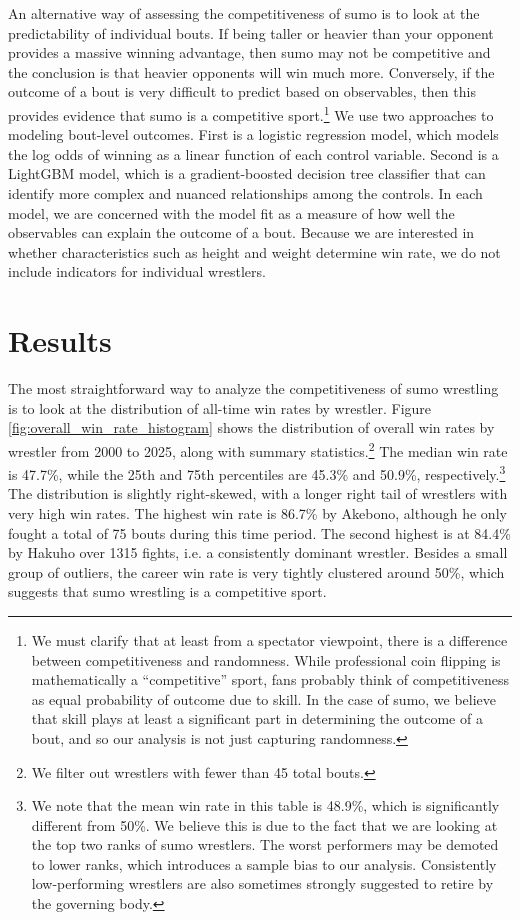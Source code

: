 \documentclass[12pt]{article}
\begin{document}
An alternative way of assessing the competitiveness of sumo is to look at the predictability of individual bouts. If being taller or heavier than your opponent provides a massive winning advantage, then sumo may not be competitive and the conclusion is that heavier opponents will win much more. Conversely, if the outcome of a bout is very difficult to predict based on observables, then this provides evidence that sumo is a competitive sport.\footnote{We must clarify that at least from a spectator viewpoint, there is a difference between competitiveness and randomness. While professional coin flipping is mathematically a ``competitive'' sport, fans probably think of competitiveness as equal probability of outcome due to skill. In the case of sumo, we believe that skill plays at least a significant part in determining the outcome of a bout, and so our analysis is not just capturing randomness.} We use two approaches to modeling bout-level outcomes. First is a logistic regression model, which models the log odds of winning as a linear function of each control variable. Second is a LightGBM model, which is a gradient-boosted decision tree classifier that can identify more complex and nuanced relationships among the controls. In each model, we are concerned with the model fit as a measure of how well the observables can explain the outcome of a bout. Because we are interested in whether characteristics such as height and weight determine win rate, we do not include indicators for individual wrestlers.

\section{Results}
The most straightforward way to analyze the competitiveness of sumo wrestling is to look at the distribution of all-time win rates by wrestler. Figure \ref{fig:overall_win_rate_histogram} shows the distribution of overall win rates by wrestler from 2000 to 2025, along with summary statistics.\footnote{We filter out wrestlers with fewer than 45 total bouts.} The median win rate is 47.7\%, while the 25th and 75th percentiles are 45.3\% and 50.9\%, respectively.\footnote{We note that the mean win rate in this table is 48.9\%, which is significantly different from 50\%. We believe this is due to the fact that we are looking at the top two ranks of sumo wrestlers. The worst performers may be demoted to lower ranks, which introduces a sample bias to our analysis. Consistently low-performing wrestlers are also sometimes strongly suggested to retire by the governing body.} The distribution is slightly right-skewed, with a longer right tail of wrestlers with very high win rates. The highest win rate is 86.7\% by Akebono, although he only fought a total of 75 bouts during this time period. The second highest is at 84.4\% by Hakuho over 1315 fights, i.e. a consistently dominant wrestler. Besides a small group of outliers, the career win rate is very tightly clustered around 50\%, which suggests that sumo wrestling is a competitive sport.
\end{document}

